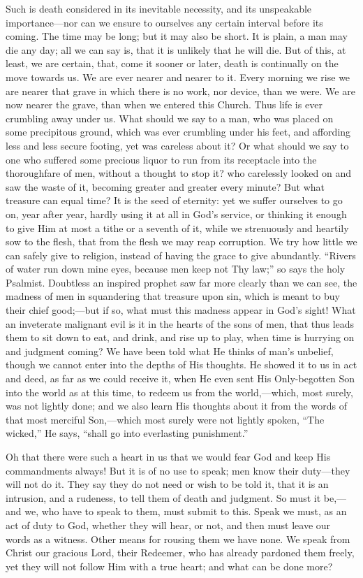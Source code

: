 Such is death considered in its inevitable necessity, and its
unspeakable importance—nor can we ensure to ourselves any certain
interval before its coming. The time may be long; but it may also be
short. It is plain, a man may die any day; all we can say is, that it
is unlikely that he will die. But of this, at least, we are certain,
that, come it sooner or later, death is continually on the move
towards us. We are ever nearer and nearer to it. Every morning we rise
we are nearer that grave in which there is no work, nor device, than
we were. We are now nearer the grave, than when we entered this
Church. Thus life is ever crumbling away under us. What should we say
to a man, who was placed on some precipitous ground, which was ever
crumbling under his feet, and affording less and less secure footing,
yet was careless about it? Or what should we say to one who suffered
some precious liquor to run from its receptacle into the thoroughfare
of men, without a thought to stop it? who carelessly looked on and saw
the waste of it, becoming greater and greater every minute? But what
treasure can equal time? It is the seed of eternity: yet we suffer
ourselves to go on, year after year, hardly using it at all in God's
service, or thinking it enough to give Him at most a tithe or a
seventh of it, while we strenuously and heartily sow to the flesh,
that from the flesh we may reap corruption. We try how little we can
safely give to religion, instead of having the grace to give
abundantly. ``Rivers of water run down mine eyes, because men keep
not Thy law;'' so says the holy Psalmist. Doubtless an inspired
prophet saw far more clearly than we can see, the madness of men in
squandering that treasure upon sin, which is meant to buy their chief
good;—but if so, what must this madness appear in God's sight! What
an inveterate malignant evil is it in the hearts of the sons of men,
that thus leads them to sit down to eat, and drink, and rise up to
play, when time is hurrying on and judgment coming? We have been told
what He thinks of man's unbelief, though we cannot enter into the
depths of His thoughts. He showed it to us in act and deed, as far as
we could receive it, when He even sent His Only-begotten Son into the
world as at this time, to redeem us from the world,—which, most
surely, was not lightly done; and we also learn His thoughts about it
from the words of that most merciful Son,—which most surely were not
lightly spoken, ``The wicked,'' He says, ``shall go into
everlasting punishment.''

Oh that there were such a heart in us that we would fear God and
keep His commandments always! But it is of no use to speak; men know
their duty—they will not do it. They say they do not need or wish to
be told it, that it is an intrusion, and a rudeness, to tell them of
death and judgment. So must it be,—and we, who have to speak to
them, must submit to this. Speak we must, as an act of duty to God,
whether they will hear, or not, and then must leave our words as a
witness. Other means for rousing them we have none. We speak from
Christ our gracious Lord, their Redeemer, who has already pardoned
them freely, yet they will not follow Him with a true heart; and what
can be done more?

